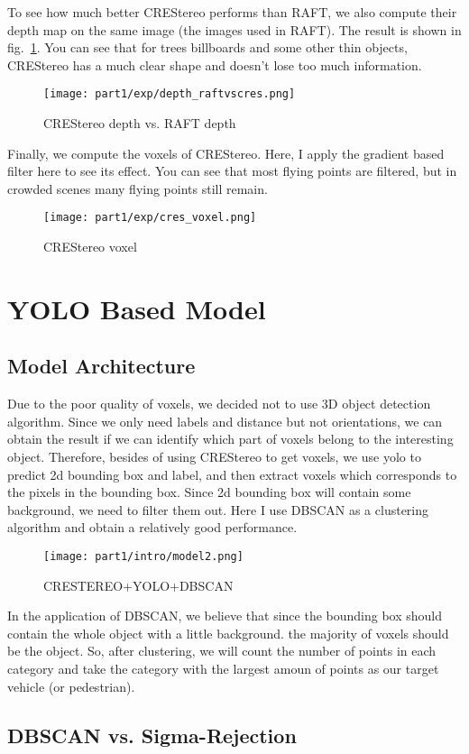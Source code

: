 \documentclass[12pt]{article}
\begin{document}
To see how much better CREStereo performs than RAFT, we also compute their depth map on the same image (the images used in RAFT). The result is shown in fig.~\ref{vs}. You can see that for trees billboards and some other thin objects, CREStereo has a much clear shape and doesn't lose too much information.
\begin{figure}[H]
    \centering
    \texttt{[image: part1/exp/depth\_raftvscres.png]}
    \caption{CREStereo depth vs. RAFT depth}
    \label{vs}
\end{figure}
Finally, we compute the voxels of CREStereo. Here, I apply the gradient based filter here to see its effect. You can see that most flying points are filtered, but in crowded scenes many flying points still remain.
\begin{figure}[H]
    \centering
    \texttt{[image: part1/exp/cres\_voxel.png]}
    \caption{CREStereo voxel}
    \label{cres_vox}
\end{figure}
\section{YOLO Based Model}
\subsection{Model Architecture}
Due to the poor quality of voxels, we decided not to use 3D object detection algorithm. Since we only need labels and distance but not orientations, we can obtain the result if we can identify which part of voxels belong to the interesting object. Therefore, besides of using CREStereo to get voxels, we use yolo to predict 2d bounding box and label, and then extract voxels which corresponds to the pixels in the bounding box. Since 2d bounding box will contain some background, we need to filter them out. Here I use DBSCAN as a clustering algorithm and obtain a relatively good performance.
\begin{figure}[H]
    \centering
    \texttt{[image: part1/intro/model2.png]}
    \caption{CRESTEREO+YOLO+DBSCAN}
    \label{model2}
\end{figure}
In the application of DBSCAN, we believe that since the bounding box should contain the whole object with a little background. the majority of voxels should be the object. So, after clustering, we will count the number of points in each category and take the category with the largest amoun of points as our target vehicle (or pedestrian).
\subsection{DBSCAN vs. Sigma-Rejection}
\end{document}
